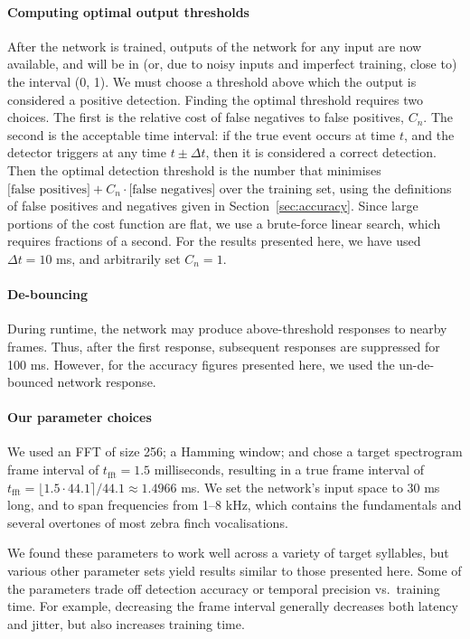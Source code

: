 \documentclass[10pt,letterpaper]{article}
\renewcommand{\subsubsection}[1]{\paragraph{#1}}
\begin{document}
\subsubsection{Computing optimal output thresholds}
\label{sec:optimalthresholds}
After the network is trained, outputs of the network for any input are
now available, and will be in (or, due to noisy inputs and imperfect
training, close to) the interval (0, 1). We must choose a threshold
above which the output is considered a positive detection. Finding the
optimal threshold requires two choices. The first is the relative cost
of false negatives to false positives, $C_n$. The second is the
acceptable time interval: if the true event occurs at time $t$, and
the detector triggers at any time $t\pm\Delta t$, then it is
considered a correct detection. Then the optimal detection threshold
is the number that minimises $\textrm{[false positives]}
+C_n\cdot\textrm{[false negatives]}$ over the training set, using the
definitions of false positives and negatives given in
Section~\ref{sec:accuracy}. Since large portions of the cost function
are flat, we use a brute-force linear search, which requires fractions of a
second. For the results presented here, we have used
$\Delta t=10$ ms, and arbitrarily set $C_n=1$.

\subsubsection{De-bouncing}

During runtime, the network may produce above-threshold responses to nearby
frames.  Thus, after the first response, subsequent responses are suppressed
for 100 ms.  However, for the accuracy figures presented here, we used
the un-de-bounced network response.

\subsubsection{Our parameter choices}

We used an FFT of size 256; a Hamming window; and chose a target
spectrogram frame interval of $t_\textrm{fft}=1.5$ milliseconds,
resulting in a true frame interval of $t_\textrm{fft}=\lfloor 1.5\cdot
44.1\rceil /44.1\approx 1.4966$ ms.  We set the network's input space
to 30 ms long, and to span frequencies from 1--8 kHz, which contains
the fundamentals and several overtones of most zebra finch
vocalisations.

We found these parameters to work well across a variety of target
syllables, but various other parameter sets yield results similar to
those presented here.  Some of the parameters trade off detection
accuracy or temporal precision vs.~training time. For example,
decreasing the frame interval generally decreases both latency and
jitter, but also increases training time.
\end{document}
